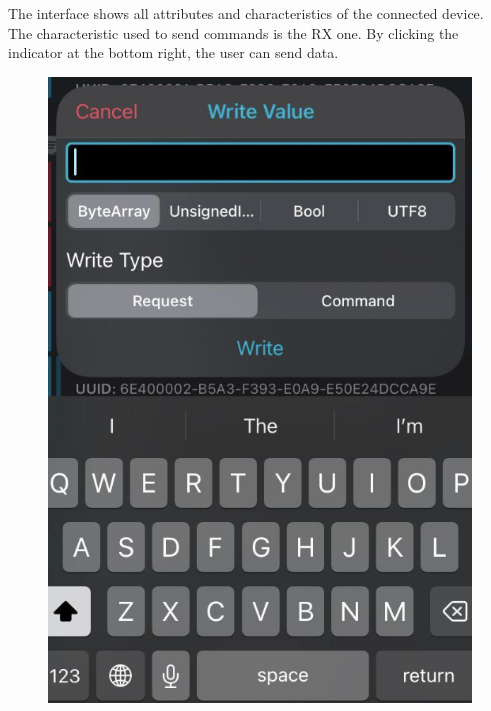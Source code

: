 \documentclass{Configuration_Files/PoliMi3i_thesis}
\begin{document}
The interface shows all attributes and characteristics of the connected device. The characteristic used to send commands is the RX one. By clicking the indicator at the bottom right, the user can send data.

\begin{figure}[H]
    \centering
    \includegraphics[scale=0.3]{Multicentral/13.png}
    \label{fig:nrf_connect_send_data}
\end{figure}
\end{document}
